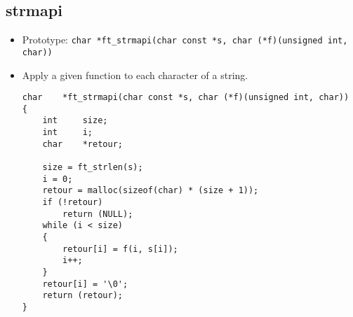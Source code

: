 \documentclass{article}
\begin{document}
	\subsection{strmapi}
		\begin{itemize}[label=$\rightarrow$]
			\item Prototype: \texttt{char    *ft\_strmapi(char const *s, char (*f)(unsigned int, char))}
			\item Apply a given function to each character of a string.
			 \begin{verbatim}
char    *ft_strmapi(char const *s, char (*f)(unsigned int, char))               
{                                                                               
    int     size;                                                               
    int     i;                                                                  
    char    *retour;                                                            
                                                                                
    size = ft_strlen(s);                                                        
    i = 0;                                                                      
    retour = malloc(sizeof(char) * (size + 1));                                 
    if (!retour)                                                                
        return (NULL);                                                          
    while (i < size)                                                            
    {                                                                           
        retour[i] = f(i, s[i]);                                                 
        i++;                                                                    
    }                                                                           
    retour[i] = '\0';                                                           
    return (retour);                                                            
}
			 \end{verbatim}
		\end{itemize}
	
\end{document}
